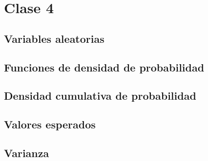 \chapter{Clase 4}

\section{Variables aleatorias}

\section{Funciones de densidad de probabilidad}

\section{Densidad cumulativa de probabilidad}

\section{Valores esperados}

\section{Varianza}
